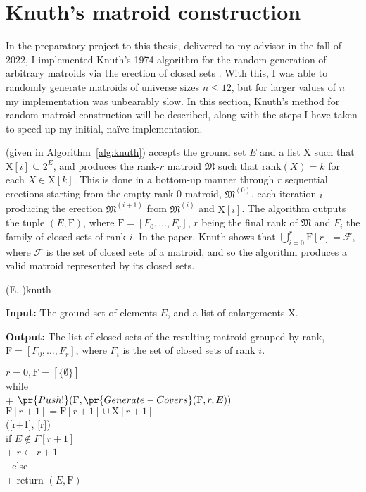 \section{Knuth's matroid construction}
\label{sec:kmc}
In the preparatory project to this thesis, delivered to my advisor in the fall of 2022, I implemented Knuth's 1974 algorithm for the random generation of arbitrary matroids via the erection of closed sets \cite{knuth-1975}. With this, I was able to randomly generate matroids of universe sizes $n \leq 12$, but for larger values of $n$ my implementation was unbearably slow. In this section, Knuth's method for random matroid construction will be described, along with the steps I have taken to speed up my initial, naïve implementation.

 (given in Algorithm~\ref{alg:knuth}) accepts the ground set $E$ and a list $\mathrm{X}$ such that $\mathrm{X}[i] \subseteq 2^E$, and produces the rank-$r$ matroid $\mathfrak{M}$ such that $\mbox{rank}(X) = k$ for each $X \in \mathrm{X}[k]$. This is done in a bottom-up manner through $r$ sequential erections starting from the empty rank-0 matroid, $\mathfrak{M}^{(0)}$, each iteration $i$ producing the erection $\mathfrak{M}^{(i+1)}$ from $\mathfrak{M}^{(i)}$ and $\mathrm{X}[i]$. The algorithm outputs the tuple $(E, \mathrm{F})$, where $\mathrm{F} = [F_0, \ldots, F_r]$, $r$ being the final rank of $\mathfrak{M}$ and $F_i$ the family of closed sets of rank $i$. In the paper, Knuth shows that $\bigcup_{i=0}^r \mathrm{F}[r] = \mathcal{F}$, where $\mathcal{F}$ is the set of closed sets of a matroid, and so the algorithm produces a valid matroid represented by its closed sets.

\begin{algorithm}[float*=ht!]{(E, )}{knuth}

  \textbf{Input:}     \tab The ground set of elements $E$, and a list of enlargements $\mathrm{X}$.

  \textbf{Output:}    \tab The list of closed sets of the resulting matroid grouped by rank, \\
  \mbox{}\tab $\mathrm{F} = [F_0, \ldots, F_r]$, where $F_i$ is the set of closed sets of rank $i$.

  \begin{pseudo}[kw, label=\small\arabic*, indent-mark, line-height=1.2]
    $r = 0, \mathrm{F} = [\{ \emptyset \}]$ \\
    while   \\+
    $\pr{Push!}(\mathrm{F}, \pr{Generate-Covers}(\mathrm{F}, r, E))$ \\
    $\mathrm{F}[r+1] = \mathrm{F}[r+1] \cup \mathrm{X}[r+1]$ \\
    ([r+1], [r]) \\

    if $E \not \in F[r+1]$ \\+
    $r \leftarrow r+1$ \\-
    else \\+
    return $(E, \mathrm{F})$

  \end{pseudo}

\end{algorithm}

